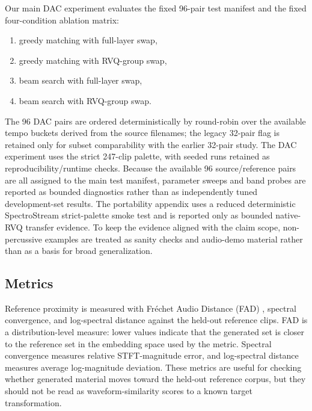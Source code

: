 \documentclass[twoside,a4paper]{article}
\begin{document}
Our main DAC experiment evaluates the fixed 96-pair test manifest and the fixed four-condition ablation matrix:
\begin{enumerate}
    \item greedy matching with full-layer swap,
    \item greedy matching with RVQ-group swap,
    \item beam search with full-layer swap,
    \item beam search with RVQ-group swap.
\end{enumerate}
The 96 DAC pairs are ordered deterministically by round-robin over the available tempo buckets derived from the source filenames; the legacy 32-pair flag is retained only for subset comparability with the earlier 32-pair study. The DAC experiment uses the strict 247-clip palette, with seeded runs retained as reproducibility/runtime checks. Because the available 96 source/reference pairs are all assigned to the main test manifest, parameter sweeps and band probes are reported as bounded diagnostics rather than as independently tuned development-set results. The portability appendix uses a reduced deterministic SpectroStream strict-palette smoke test and is reported only as bounded native-RVQ transfer evidence. To keep the evidence aligned with the claim scope, non-percussive examples are treated as sanity checks and audio-demo material rather than as a basis for broad generalization.

\subsection{Metrics}

Reference proximity is measured with Fr\'echet Audio Distance (FAD) \cite{Kilgour:2019:FAD}, spectral convergence, and log-spectral distance against the held-out reference clips. FAD is a distribution-level measure: lower values indicate that the generated set is closer to the reference set in the embedding space used by the metric. Spectral convergence measures relative STFT-magnitude error, and log-spectral distance measures average log-magnitude deviation. These metrics are useful for checking whether generated material moves toward the held-out reference corpus, but they should not be read as waveform-similarity scores to a known target transformation.
\end{document}
